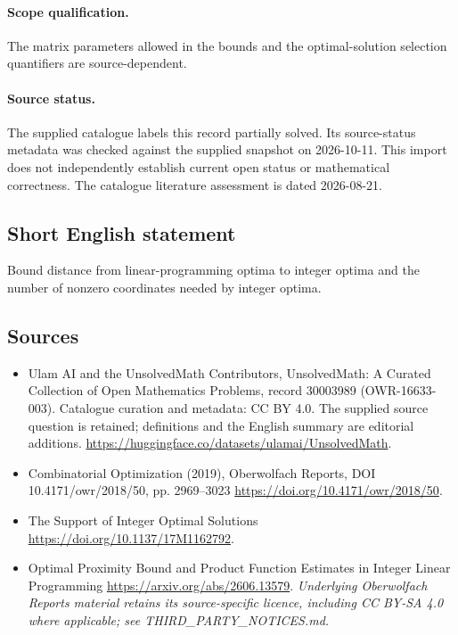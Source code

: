 \documentclass[11pt]{article}
\begin{document}
\paragraph{Scope qualification.}
The matrix parameters allowed in the bounds and the optimal-solution selection quantifiers are source-dependent.
\paragraph{Source status.}
The supplied catalogue labels this record partially solved. Its source-status metadata was checked against the supplied snapshot on 2026-10-11. This import does not independently establish current open status or mathematical correctness. The catalogue literature assessment is dated 2026-08-21.
\subsection{Short English statement}
Bound distance from linear-programming optima to integer optima and the number of nonzero coordinates needed by integer optima.
\subsection{Sources}
\begin{itemize}
\item[\hypertarget{source:30003989:1}{S1}] Ulam AI and the UnsolvedMath Contributors, UnsolvedMath: A Curated Collection of Open Mathematics Problems, record 30003989 (OWR-16633-003). Catalogue curation and metadata: CC BY 4.0. The supplied source question is retained; definitions and the English summary are editorial additions.
\url{https://huggingface.co/datasets/ulamai/UnsolvedMath}.
\item[\hypertarget{source:30003989:2}{S2}] Combinatorial Optimization (2019), Oberwolfach Reports, DOI 10.4171/owr/2018/50, pp. 2969--3023
\url{https://doi.org/10.4171/owr/2018/50}.
\item[\hypertarget{source:30003989:3}{S3}] The Support of Integer Optimal Solutions
\url{https://doi.org/10.1137/17M1162792}.
\item[\hypertarget{source:30003989:4}{S4}] Optimal Proximity Bound and Product Function Estimates in Integer Linear Programming
\url{https://arxiv.org/abs/2606.13579}.
\textit{Underlying Oberwolfach Reports material retains its source-specific licence, including CC BY-SA 4.0 where applicable; see THIRD\_PARTY\_NOTICES.md.}
\end{itemize}
\end{document}
